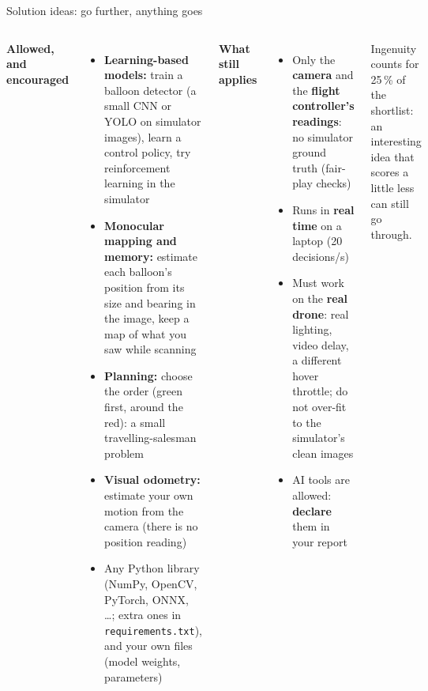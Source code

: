 \documentclass[aspectratio=169,11pt]{beamer}
\newcommand{\code}[1]{\texttt{\small #1}}
\begin{document}
\begin{frame}{Solution ideas: go further, anything goes}
  \begin{columns}[T]
    \small\textbf{Allowed, and encouraged}
    \begin{itemize}\footnotesize
      \item \textbf{Learning-based models:} train a balloon detector
            (a small CNN or YOLO on simulator images), learn a control
            policy, try reinforcement learning in the simulator
      \item \textbf{Monocular mapping and memory:} estimate each
            balloon's position from its size and bearing in the image,
            keep a map of what you saw while scanning
      \item \textbf{Planning:} choose the order (green first, around the
            red): a small travelling-salesman problem
      \item \textbf{Visual odometry:} estimate your own motion from
            the camera (there is no position reading)
      \item Any Python library (NumPy, OpenCV, PyTorch, ONNX, \ldots;
            extra ones in \code{requirements.txt}), and your own files
            (model weights, parameters)
    \end{itemize}
    \small\textbf{What still applies}
    \begin{itemize}\footnotesize
      \item Only the \textbf{camera} and the \textbf{flight controller's
            readings}: no simulator ground truth (fair-play checks)
      \item Runs in \textbf{real time} on a laptop (20 decisions/s)
      \item Must work on the \textbf{real drone}: real lighting, video
            delay, a different hover throttle; do not over-fit to the
            simulator's clean images
      \item AI tools are allowed: \textbf{declare} them in your report
    \end{itemize}
    \vspace{2mm}
    \begin{alertblock}{}
      \footnotesize Ingenuity counts for 25\,\% of the shortlist:
      an interesting idea that scores a little less can still go through.
    \end{alertblock}
  \end{columns}
\end{frame}
\end{document}
